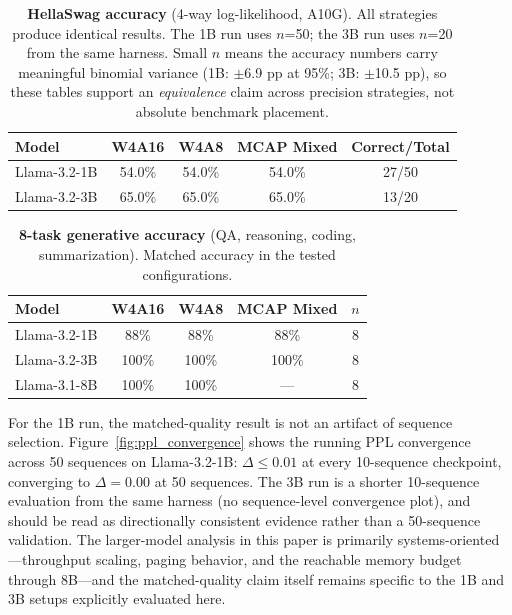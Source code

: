 \documentclass{article}
\begin{document}
\begin{table}[H]
\centering
\caption{\textbf{HellaSwag accuracy} (4-way log-likelihood, A10G). All strategies produce
identical results. The 1B run uses $n$=50; the 3B run uses $n$=20 from the same harness.
Small $n$ means the accuracy numbers carry meaningful binomial variance (1B: $\pm$6.9 pp
at 95\%; 3B: $\pm$10.5 pp), so these tables support an \emph{equivalence} claim across
precision strategies, not absolute benchmark placement.}
\label{tab:hellaswag}
\small
\begin{tabular}{lcccc}
\toprule
Model & W4A16 & W4A8 & MCAP Mixed & Correct/Total \\
\midrule
Llama-3.2-1B & 54.0\% & 54.0\% & 54.0\% & 27/50 \\
Llama-3.2-3B & 65.0\% & 65.0\% & 65.0\% & 13/20 \\
\bottomrule
\end{tabular}
\end{table}

\begin{table}[H]
\centering
\caption{\textbf{8-task generative accuracy} (QA, reasoning, coding, summarization).
Matched accuracy in the tested configurations.}
\label{tab:task_acc}
\small
\begin{tabular}{lcccc}
\toprule
Model & W4A16 & W4A8 & MCAP Mixed & $n$ \\
\midrule
Llama-3.2-1B & 88\% & 88\% & 88\% & 8 \\
Llama-3.2-3B & 100\% & 100\% & 100\% & 8 \\
Llama-3.1-8B & 100\% & 100\% & --- & 8 \\
\bottomrule
\end{tabular}
\end{table}

For the 1B run, the matched-quality result is not an artifact of sequence
selection. Figure~\ref{fig:ppl_convergence} shows the running PPL convergence
across 50 sequences on Llama-3.2-1B: $\Delta \leq 0.01$ at every 10-sequence
checkpoint, converging to $\Delta = 0.00$ at 50 sequences. The 3B run is a
shorter 10-sequence evaluation from the same harness (no sequence-level
convergence plot), and should be read as directionally consistent evidence
rather than a 50-sequence validation. The larger-model analysis in this paper
is primarily systems-oriented---throughput scaling, paging behavior, and the
reachable memory budget through 8B---and the matched-quality claim itself
remains specific to the 1B and 3B setups explicitly evaluated here.
\end{document}
